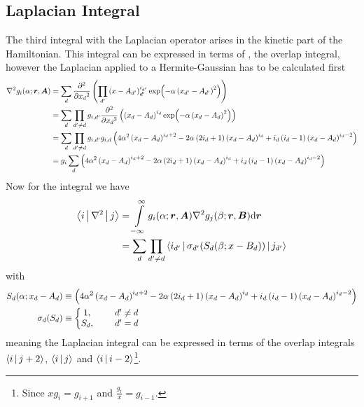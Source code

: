 \subsection{Laplacian Integral}
    The third integral with the Laplacian operator arises in the kinetic part
    of the Hamiltonian. This integral can be expressed in terms of
    , the overlap integral, however the Laplacian applied
    to a Hermite-Gaussian has to be calculated first
        \begin{align}
            \nabla^2 g_i(\alpha;\blds{r},\blds{A}) &= \sum_d \prd{x_d}[][2]
            \left(\prod_{d'} \left(x - A_{d'}\right)^{i_{d'}}_{d'} \exp(-\alpha
            \left(x_{d'} - A_{d'}\right)^2)\right)\nonumber \\
            &= \sum_d \prod_{d'\neq d} g_{i,d'} \prd{x_d}[][2]\left(\left(x_d -
            A_d\right)^{i_d} \exp(-\alpha \left(x_d - A_d\right)^2)\right)
            \nonumber \\
            &= \sum_d \prod_{d'\neq d} g_{i,d'} g_{i,d}
            \left(4\alpha^2\left(x_d-A_d\right)^{i_d+2} -
            2\alpha\left(2i_d+1\right)\left(x_d-A_d\right)^{i_d} +
            i_d\left(i_d-1\right)\left(x_d-A_d\right)^{i_d-2}\right) \nonumber
            \\
            &= g_i\sum_d \left(4\alpha^2\left(x_d-A_d\right)^{i_d+2} -
            2\alpha\left(2i_d+1\right)\left(x_d-A_d\right)^{i_d} +
            i_d\left(i_d-1\right)\left(x_d-A_d\right)^{i_d-2}\right)
        \end{align}
    Now for the integral we have
        \begin{align}
            \Braket{i|\nabla^2|j} &= \int\limits^{\infty}_{-\infty}
            g_i(\alpha;\boldsymbol{{r}},\boldsymbol{{A}})\nabla^2g_j(\beta;\boldsymbol{{r}},\boldsymbol{{B}}) 
            \mathrm{d}\boldsymbol{{r}} \nonumber \\
            &= \sum_d\prod_{d'\neq d}
            \Braket{i_{d'}|\sigma_{d'}(S_d(\beta;x-B_d))|j_{d'}}
            \label{eq:laplacianIntegral}
        \end{align}
    with
        \begin{equation}
            \begin{aligned}
                S_d(\alpha;x_d-A_d) &\equiv
                \left(4\alpha^2\left(x_d-A_d\right)^{i_d+2} -
                2\alpha\left(2i_d+1\right)\left(x_d-A_d\right)^{i_d} +
                i_d\left(i_d-1\right)\left(x_d-A_d\right)^{i_d-2}\right) \\
                \sigma_d(S_d) &\equiv \left\{\begin{matrix}
                                            1,&\indent d' \neq d \\
                                            S_d,&\indent d' = d
                                            \end{matrix}
                                        \right.
            \end{aligned}
        \end{equation}
    meaning the Laplacian integral can be expressed in terms of the overlap
    integrals $\Braket{i|j+2}$, $\Braket{i|j}$ and
    $\Braket{i|i-2}$\footnote{Since $xg_i=g_{i+1}$ and
    $\frac{g_i}{x}=g_{i-1}$.}.

